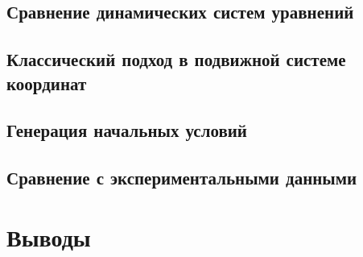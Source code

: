\documentclass[14pt, a4paper]{extbook}
\begin{document}
\section{Сравнение динамических систем уравнений}
\section{Классический подход в подвижной системе координат}
\section{Генерация начальных условий}
\section{Сравнение с экспериментальными данными}

\chapter{Выводы}

%



\end{document}
